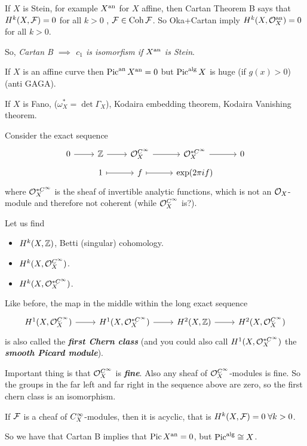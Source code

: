 \begin{example}
	If $X$ is Stein, for example $X^{\mathrm{an}}$ for $X$ affine, then Cartan Theorem B says that $H^k(X,\mathcal{F})=0$ for all $k>0$ , $\mathcal{F}\in\operatorname{Coh}\mathcal{F}$. So Oka+Cartan imply $H^k(X,\mathcal{O}_X^{\mathrm{an}})=0$ for all $k>0$.
	
	So, \textit{Cartan B $\implies$ $c_1$ is isomorfism if $X^{\mathrm{an}}$ is Stein}.
\end{example}
\begin{example}[subexample]
	If $X$ is an affine curve then $\operatorname{Pic}^{\mathrm{an}}X^{\mathrm{an}}=0$ but $\operatorname{Pic}^{\mathrm{alg}}X$ is huge (if $g(x)>0$) (anti GAGA).
\end{example}
\begin{example}
	If $X$ is Fano, ($\omega^*_X=\det\Gamma_X$), Kodaira embedding theorem, Kodaira Vanishing theorem.
\end{example}

\begin{example}
	Consider the exact sequence
	\[\begin{tikzcd}[row sep=tiny]
		0\arrow[r]&\Z\arrow[r]&\Oc_X^{\Cinf}\arrow[r]&\Oc_X^{*\Cinf}\arrow[r]&0\\
		&1\arrow[r,maps to]&f\arrow[r,maps to]&\exp(2\pi if)
	\end{tikzcd}\]
	where $\mathcal{O}_X^{*C^\infty}$ is the sheaf of invertible analytic functions, which is not an $\mathcal{O}_X$-module and therefore not coherent ({\color{magenta}while $\mathcal{O}_X^{C^\infty}$ is?}).
	
	Let us find
	\begin{itemize}
		\item $H^k(X,\mathbb{Z})$, Betti (singular) cohomology.
		\item $H^k(X,\mathcal{O}_X^{C^\infty})$.
		\item $H^k(X,\mathcal{O}^{*C^\infty}_X)$.
	\end{itemize}
	Like before, the map in the middle within the long exact sequence
	\[\begin{tikzcd}[row sep=tiny]
		H^1(X,\Oc^{\Cinf}_X)\arrow[r]&H^1(X,\Oc^{*\Cinf}_X)\arrow[r]&H^2(X,\Z)\arrow[r]&H^2(X,\Oc^{\Cinf}_X)
	\end{tikzcd}\]
	is also called the \textbf{\textit{first Chern class}} (and you could also call $H^1(X,\mathcal{O}^{*C^\infty}_X)$ the \textbf{\textit{smooth Picard module}}).
	
	Important thing is that $\mathcal{O}_X^{C^\infty}$ is \textbf{\textit{fine}}. Also any sheaf of $\mathcal{O}_X^{C^\infty}$-modules is fine. So the groups in the far left and far right in the sequence above are zero, so the first chern class is an isomorphism.
	
	\begin{coro}
		If $\mathcal{F}$ is a cheaf of $C^\infty_X$-modules, then it is acyclic, that is $H^k(X,\mathcal{F})=0\;\forall k>0$.
	\end{coro}
\end{example}
\begin{remark}
	So we have that Cartan B implies that $\operatorname{Pic} X^{\mathrm{an}}=0$, but $\operatorname{Pic}^{\mathrm{alg}}\cong X$.
\end{remark}

